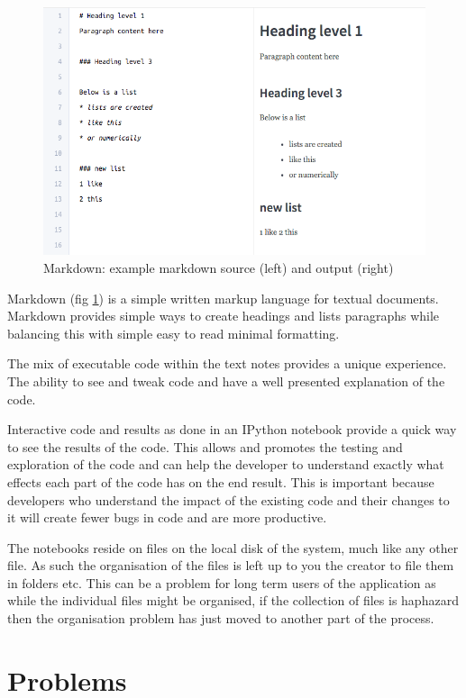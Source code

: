 \begin{figure}
  \includegraphics[width=\linewidth]{Figures/markdown.png}
  \caption{Markdown: example markdown source (left) and output (right)}
  \label{fig:markdownexample}
\end{figure}

Markdown (fig \ref{fig:markdownexample}) is a simple written markup language for
textual documents. Markdown provides simple ways to create headings and lists
paragraphs while balancing this with simple easy to read minimal formatting.

The mix of executable code within the text notes provides a unique
experience. The ability to see and tweak code and have a well
presented explanation of the code.

Interactive code and results as done in an IPython notebook provide a
quick way to see the results of the code. This allows and promotes the
testing and exploration of the code and can help the developer to
understand exactly what effects each part of the code has on the end
result. This is important because developers who understand the impact of the
existing code and their changes to it will create fewer bugs in code and are
more productive.

The notebooks reside on files on the local disk of the system, much like
any other file. As such the organisation of the files is left up to you
the creator to file them in folders etc. This can be a problem for long term
users of the application as while the individual files might be organised, if
the collection of files is haphazard then the organisation problem has just
moved to another part of the process.

\section{Problems}\label{problems}

